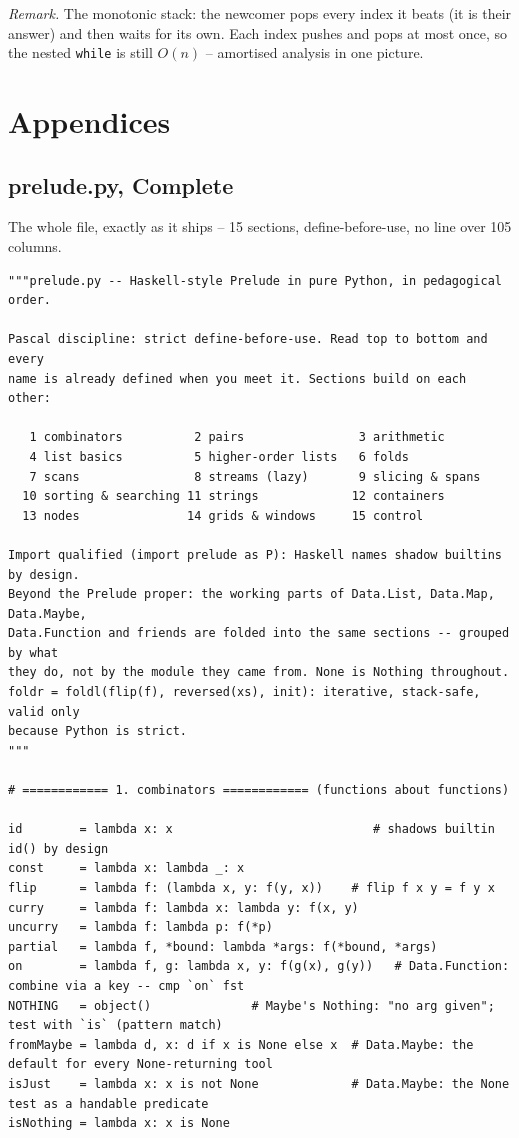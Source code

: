 \documentclass[11pt,letterpaper]{book}
\begin{document}
\noindent\textit{Remark.} The monotonic stack: the newcomer pops every index it
beats (it is their answer) and then waits for its own. Each index pushes and
pops at most once, so the nested \texttt{while} is still $O(n)$ -- amortised
analysis in one picture.
\appendix
\part{Appendices}
\chapter{prelude.py, Complete}
The whole file, exactly as it ships -- 15 sections, define-before-use,
no line over 105 columns.
\begin{lstlisting}[style=file]
"""prelude.py -- Haskell-style Prelude in pure Python, in pedagogical order.

Pascal discipline: strict define-before-use. Read top to bottom and every
name is already defined when you meet it. Sections build on each other:

   1 combinators          2 pairs                3 arithmetic
   4 list basics          5 higher-order lists   6 folds
   7 scans                8 streams (lazy)       9 slicing & spans
  10 sorting & searching 11 strings             12 containers
  13 nodes               14 grids & windows     15 control

Import qualified (import prelude as P): Haskell names shadow builtins by design.
Beyond the Prelude proper: the working parts of Data.List, Data.Map, Data.Maybe,
Data.Function and friends are folded into the same sections -- grouped by what
they do, not by the module they came from. None is Nothing throughout.
foldr = foldl(flip(f), reversed(xs), init): iterative, stack-safe, valid only
because Python is strict.
"""

# ============ 1. combinators ============ (functions about functions)

id        = lambda x: x                            # shadows builtin id() by design
const     = lambda x: lambda _: x
flip      = lambda f: (lambda x, y: f(y, x))    # flip f x y = f y x
curry     = lambda f: lambda x: lambda y: f(x, y)
uncurry   = lambda f: lambda p: f(*p)
partial   = lambda f, *bound: lambda *args: f(*bound, *args)
on        = lambda f, g: lambda x, y: f(g(x), g(y))   # Data.Function: combine via a key -- cmp `on` fst
NOTHING   = object()              # Maybe's Nothing: "no arg given"; test with `is` (pattern match)
fromMaybe = lambda d, x: d if x is None else x  # Data.Maybe: the default for every None-returning tool
isJust    = lambda x: x is not None             # Data.Maybe: the None test as a handable predicate
isNothing = lambda x: x is None


\end{lstlisting}
\end{document}
